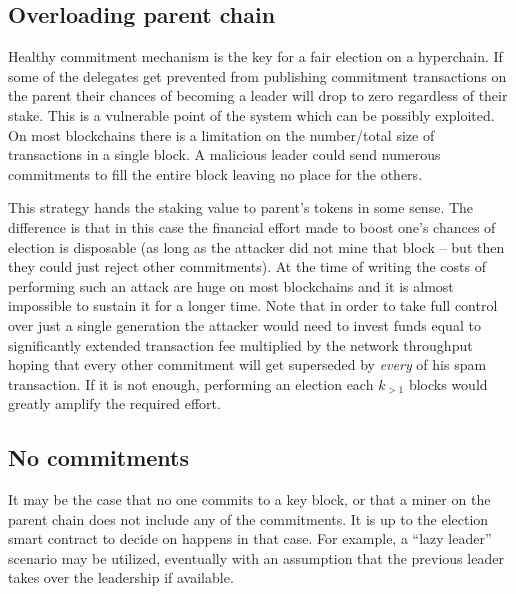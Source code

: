 \subsection{Overloading parent chain}

Healthy commitment mechanism is the key for a fair election on a hyperchain. If
some of the delegates get prevented from publishing commitment transactions on
the parent their chances of becoming a leader will drop to zero regardless of
their stake. This is a vulnerable point of the system which can be possibly
exploited. On most blockchains there is a limitation on the number/total size of
transactions in a single block. A malicious leader could send numerous
commitments to fill the entire block leaving no place for the others.

This strategy hands the staking value to parent's tokens in some sense. The
difference is that in this case the financial effort made to boost one's chances
of election is disposable (as long as the attacker did not mine that block – but
then they could just reject other commitments). At the time of writing the costs
of performing such an attack are huge on most blockchains and it is almost
impossible to sustain it for a longer time. Note that in order to take full
control over just a single generation the attacker would need to invest funds
equal to significantly extended transaction fee multiplied by the network
throughput hoping that every other commitment will get superseded by
\textit{every} of his spam transaction. If it is not enough, performing an
election each $k_{> 1}$ blocks would greatly amplify the required effort.

\subsection{No commitments}

It may be the case that no one commits to a key block, or that a miner on the
parent chain does not include any of the commitments. It is up to the election
smart contract to decide on happens in that case. For example, a ``lazy leader''
scenario may be utilized, eventually with an assumption that the previous leader
takes over the leadership if available.
